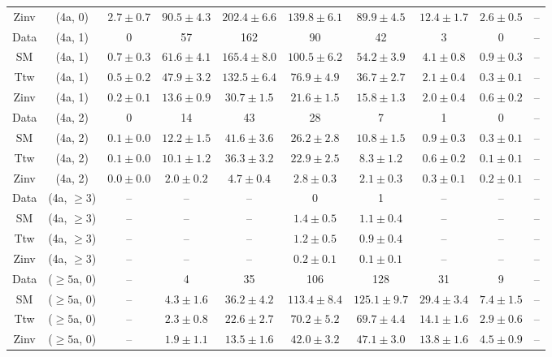 \begin{table}[h!]
{\begin{tabular}{cccccccccc}
	Zinv & (4a, 0) & $2.7\pm 0.7$ & $90.5\pm 4.3$ & $202.4\pm 6.6$ & $139.8\pm 6.1$ & $89.9\pm 4.5$ & $12.4\pm 1.7$ & $2.6\pm 0.5$ & -- \\[0.5ex] 
	Data & (4a, 1) & 0 & 57 & 162 & 90 & 42 & 3 & 0 & -- \\[0.5ex] 
	SM & (4a, 1) & $0.7\pm 0.3$ & $61.6\pm 4.1$ & $165.4\pm 8.0$ & $100.5\pm 6.2$ & $54.2\pm 3.9$ & $4.1\pm 0.8$ & $0.9\pm 0.3$ & -- \\[0.5ex] 
	Ttw & (4a, 1) & $0.5\pm 0.2$ & $47.9\pm 3.2$ & $132.5\pm 6.4$ & $76.9\pm 4.9$ & $36.7\pm 2.7$ & $2.1\pm 0.4$ & $0.3\pm 0.1$ & -- \\[0.5ex] 
	Zinv & (4a, 1) & $0.2\pm 0.1$ & $13.6\pm 0.9$ & $30.7\pm 1.5$ & $21.6\pm 1.5$ & $15.8\pm 1.3$ & $2.0\pm 0.4$ & $0.6\pm 0.2$ & -- \\[0.5ex] 
	Data & (4a, 2) & 0 & 14 & 43 & 28 & 7 & 1 & 0 & -- \\[0.5ex] 
	SM & (4a, 2) & $0.1\pm 0.0$ & $12.2\pm 1.5$ & $41.6\pm 3.6$ & $26.2\pm 2.8$ & $10.8\pm 1.5$ & $0.9\pm 0.3$ & $0.3\pm 0.1$ & -- \\[0.5ex] 
	Ttw & (4a, 2) & $0.1\pm 0.0$ & $10.1\pm 1.2$ & $36.3\pm 3.2$ & $22.9\pm 2.5$ & $8.3\pm 1.2$ & $0.6\pm 0.2$ & $0.1\pm 0.1$ & -- \\[0.5ex] 
	Zinv & (4a, 2) & $0.0\pm 0.0$ & $2.0\pm 0.2$ & $4.7\pm 0.4$ & $2.8\pm 0.3$ & $2.1\pm 0.3$ & $0.3\pm 0.1$ & $0.2\pm 0.1$ & -- \\[0.5ex] 
	Data & (4a, $\ge3$) & -- & -- & -- & 0 & 1 & -- & -- & -- \\[0.5ex] 
	SM & (4a, $\ge3$) & -- & -- & -- & $1.4\pm 0.5$ & $1.1\pm 0.4$ & -- & -- & -- \\[0.5ex] 
	Ttw & (4a, $\ge3$) & -- & -- & -- & $1.2\pm 0.5$ & $0.9\pm 0.4$ & -- & -- & -- \\[0.5ex] 
	Zinv & (4a, $\ge3$) & -- & -- & -- & $0.2\pm 0.1$ & $0.1\pm 0.1$ & -- & -- & -- \\[0.5ex] 
	Data & ($\ge5$a, 0) & -- & 4 & 35 & 106 & 128 & 31 & 9 & -- \\[0.5ex] 
	SM & ($\ge5$a, 0) & -- & $4.3\pm 1.6$ & $36.2\pm 4.2$ & $113.4\pm 8.4$ & $125.1\pm 9.7$ & $29.4\pm 3.4$ & $7.4\pm 1.5$ & -- \\[0.5ex] 
	Ttw & ($\ge5$a, 0) & -- & $2.3\pm 0.8$ & $22.6\pm 2.7$ & $70.2\pm 5.2$ & $69.7\pm 4.4$ & $14.1\pm 1.6$ & $2.9\pm 0.6$ & -- \\[0.5ex] 
	Zinv & ($\ge5$a, 0) & -- & $1.9\pm 1.1$ & $13.5\pm 1.6$ & $42.0\pm 3.2$ & $47.1\pm 3.0$ & $13.8\pm 1.6$ & $4.5\pm 0.9$ & -- \\[0.5ex] 

\end{tabular}}
\end{table}
